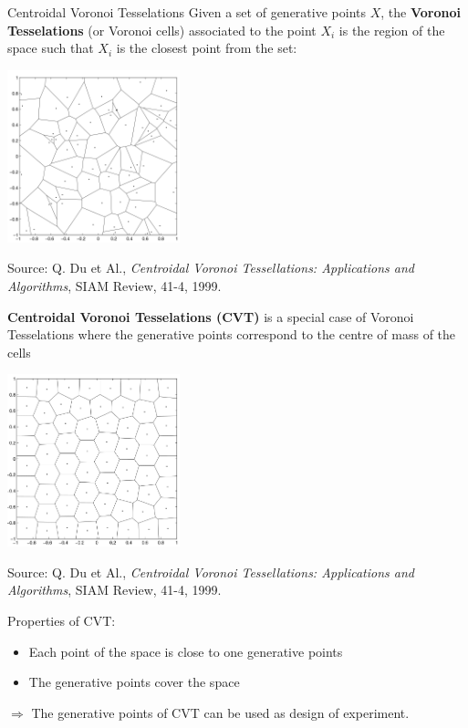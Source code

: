 \begin{frame}{Centroidal Voronoi Tesselations}
Given a set of generative points $X$, the \textbf{Voronoi Tesselations} (or Voronoi cells) associated to the point $X_i$ is the region of the space such that $X_i$ is the closest point from the set:
\begin{center}
\includegraphics[height=5cm]{2_Design_of_experiments/figures/VT}
\end{center}
Source: Q. Du et Al., \emph{Centroidal Voronoi Tessellations: Applications and Algorithms}, SIAM Review, 41-4, 1999.
\end{frame}

\begin{frame}{}
\textbf{Centroidal Voronoi Tesselations (CVT)} is a special case of Voronoi Tesselations where the generative points correspond to the centre of mass of the cells
\begin{center}
\includegraphics[height=5cm]{2_Design_of_experiments/figures/CVT}
\end{center}
Source: Q. Du et Al., \emph{Centroidal Voronoi Tessellations: Applications and Algorithms}, SIAM Review, 41-4, 1999.
\end{frame}

\begin{frame}{}

Properties of CVT:
\begin{itemize}
	\item Each point of the space is close to one generative points
	\item The generative points cover the space
\end{itemize}
$\Rightarrow$ The generative points of CVT can be used as design of experiment.
\end{frame}

